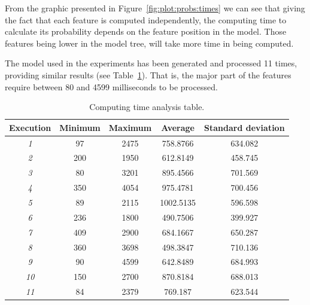 From the graphic presented in Figure~\ref{fig:plot:probs:times} we can see that giving the fact that each feature is computed independently, the
computing time to calculate its probability depends on the feature position in the model.
Those features being lower in the model tree, will take more
time in being computed.

The model used in the experiments has been generated and processed 11 times, providing similar results
(see Table~\ref{execution_times}). That is, the
major part of the features require between 80 and 4599 milliseconds to be processed.

\begin{table}[h]
        \centering
        \begin{tabular}{|c|c|c|c|c|}
                \hline
                \textbf{Execution} & \textbf{Minimum} &  \textbf{Maximum} &  \textbf{Average} &  \textbf{Standard deviation} \\ \hline
                \textit{1}              & 97   & 2475  & 758.8766  & 634.082        \\ \hline
                \textit{2}              & 200  & 1950  & 612.8149  & 458.745        \\ \hline
                \textit{3}              & 80   & 3201  & 895.4566  & 701.569        \\ \hline
                \textit{4}              & 350  & 4054  & 975.4781  & 700.456        \\ \hline
                \textit{5}              & 89   & 2115  & 1002.5135 & 596.598        \\ \hline
                \textit{6}              & 236  & 1800  & 490.7506  & 399.927        \\ \hline
                \textit{7}              & 409  & 2900  & 684.1667  & 650.287        \\ \hline
                \textit{8}              & 360  & 3698  & 498.3847  & 710.136        \\ \hline
                \textit{9}              & 90   & 4599  & 642.8489  & 684.993        \\ \hline
                \textit{10}             & 150  & 2700  & 870.8184  & 688.013        \\ \hline
                \textit{11}             & 84   & 2379  & 769.187   & 623.544        \\ \hline
        \end{tabular}
        \caption{Computing time analysis table.}
        \label{execution_times}
\end{table}

